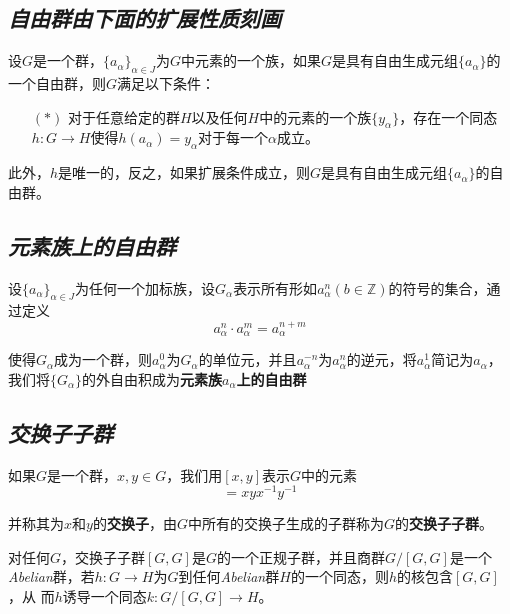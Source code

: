 \subsection*{\textsl{自由群由下面的扩展性质刻画}}
\begin{mdframed}
    \begin{lemma}
        设$G$是一个群，$\{a_\alpha\}_{\alpha\in J}$为$G$中元素的一个族，如果$G$是具有自由生成元组$\{a_\alpha\}$的一个自由群，则$G$满足以下条件：
        \begin{enumerate}[itemindent=2em]
            \item[$(*)$] 对于任意给定的群$H$以及任何$H$中的元素的一个族$\{y_\alpha\}$，存在一个同态$h:G\rightarrow H$使得$h(a_\alpha)=y_\alpha$对于每一个$\alpha$成立。
        \end{enumerate}

        此外，$h$是唯一的，反之，如果扩展条件成立，则$G$是具有自由生成元组$\{a_\alpha\}$的自由群。
    \end{lemma}
\end{mdframed}

\subsection*{\textsl{元素族上的自由群}}

设$\{a_\alpha\}_{\alpha\in J}$为任何一个加标族，设$G_\alpha$表示所有形如$a^n_\alpha(b\in \mathbb{Z})$的符号的集合，通过定义
\begin{equation}
    a^n_\alpha\cdot a^m_\alpha=a^{n+m}_\alpha
\end{equation}

使得$G_\alpha$成为一个群，则$a^0_\alpha$为$G_\alpha$的单位元，并且$a^{-n}_\alpha$为$a^n_\alpha$的逆元，将$a^1_\alpha$简记为$a_\alpha$，我们将$\{G_\alpha\}$的外自由积成为\textbf{元素族$a_\alpha$上的自由群}

\subsection*{\textsl{交换子子群}}

如果$G$是一个群，$x,y\in G$，我们用$[x,y]$表示$G$中的元素
\begin{equation}
    [x,y]=xyx^{-1}y^{-1}
\end{equation}

并称其为$x$和$y$的\textbf{交换子}，由$G$中所有的交换子生成的子群称为$G$的\textbf{交换子子群}。

\begin{mdframed}
    \begin{theorem}
        对任何$G$，交换子子群$[G,G]$是$G$的一个正规子群，并且商群$G/[G,G]$是一个\textsl{Abelian}群，若$h:G\rightarrow H$为$G$到任何\textsl{Abelian}群$H$的一个同态，则$h$的核包含$[G,G]$，从
        而$h$诱导一个同态$k:G/[G,G]\rightarrow H$。
    \end{theorem}
\end{mdframed}

